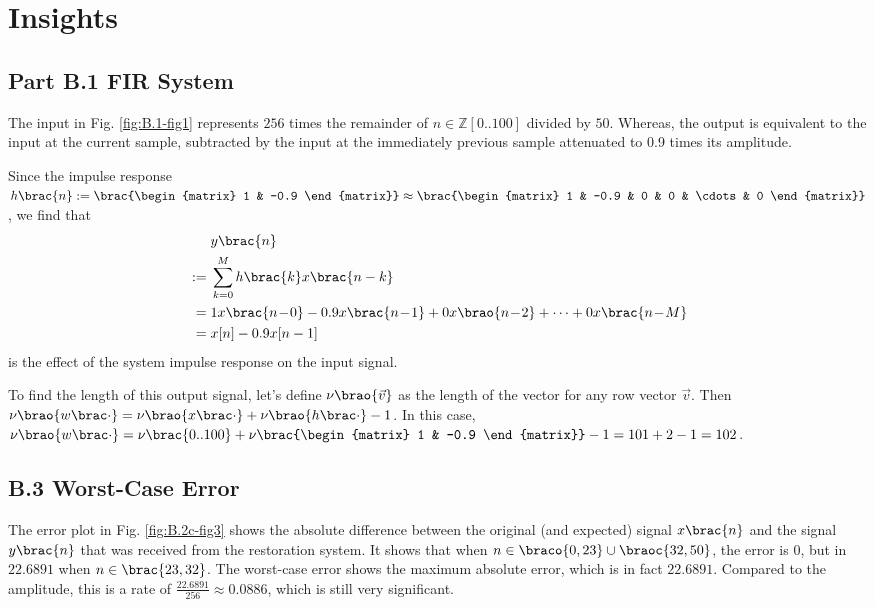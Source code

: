 \documentclass[conference]{../lib/IEEEtran}
\DeclarePairedDelimiter\brao()%
\DeclarePairedDelimiter\brac[]%
\DeclarePairedDelimiter\braco[)%
\DeclarePairedDelimiter\braoc(]%
\begin{document}
\section{Insights}

\subsection{Part B.1 FIR System}

The input in Fig. \ref{fig:B.1-fig1} represents \(256\) times the remainder of \(n \in \mathbb{Z}[0..100]\) divided by \(50\). Whereas, the output is equivalent to the input at the current sample, subtracted by the input at the immediately previous sample attenuated to 0.9 times its amplitude.

Since the impulse response \( h\brac{n} := \brac{\begin{matrix} 1 & -0.9 \end{matrix}} \approx \brac{\begin{matrix} 1 & -0.9 & 0 & 0 & \cdots & 0 \end{matrix}}\), we find that
\[
    \begin{aligned}
        &y\brac{n}
    \\*
        {}:={}& \sum_{k = 0}^{M} h\brac{k}x\brac{n - k}
    \\*
        {}\hphantom:={}& 1x\brac{n\!-\!0} - 0.9 x\brac{n\!-\!1} + 0x\brao{n\!-\!2} + \cdots + 0x\brac{n\!-\!M}
    \\*
        {}\hphantom:={}& x[n] - 0.9 x[n - 1]
     \end{aligned}
\]
is the effect of the system impulse response on the input signal.

To find the length of this output signal, let's define \(\nu\brao{\vec{v}}\) as the length of the vector for any row vector \(\vec{v}\). Then \(\nu\brao{w\brac\cdot} = \nu\brao{x\brac\cdot} + \nu\brao{h\brac\cdot} - 1\). In this case, \(\nu\brao{w\brac\cdot} = \nu\brac{0..100} + \nu\brac{\begin{matrix} 1 & -0.9 \end{matrix}} - 1 = 101 + 2 - 1 = 102\).

\subsection{B.3 Worst-Case Error}

The error plot in Fig. \ref{fig:B.2c-fig3} shows the absolute difference between the original (and expected) signal \(x\brac{n}\) and the signal \(y\brac{n}\) that was received from the restoration system. It shows that when \(n \in \braco{0, 23} \cup \braoc{32, 50}\), the error is \(0\), but in \(22.6891\) when \(n \in \brac{23, 32}\). The worst-case error shows the maximum absolute error, which is in fact \(22.6891\). Compared to the amplitude, this is a rate of \(\frac{22.6891}{256} \approx 0.0886\), which is still very significant.
\end{document}

